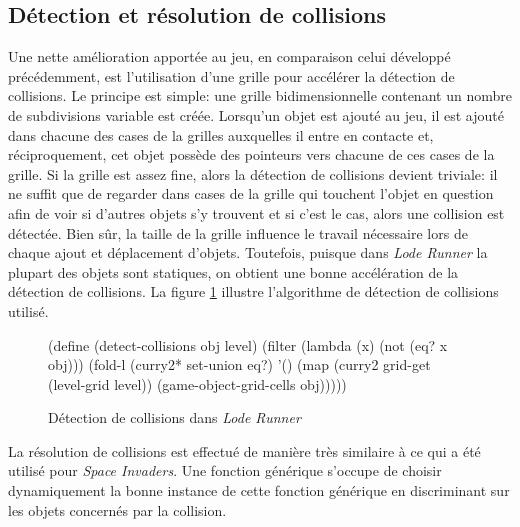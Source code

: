 \documentclass[12pt,twoside,letterpaper,francais]{book}
\newcommand{\scheme}[1]{\selectlanguage{english}{\tt #1}\selectlanguage{french}}
\begin{document}
\subsection{Détection et résolution de collisions}
Une nette amélioration apportée au jeu, en comparaison celui développé
précédemment, est l'utilisation d'une grille pour accélérer la
détection de collisions. Le principe est simple: une grille
bidimensionnelle contenant un nombre de subdivisions variable est
créée. Lorsqu'un objet est ajouté au jeu, il est ajouté dans chacune
des cases de la grilles auxquelles il entre en contacte et,
réciproquement, cet objet possède des pointeurs vers chacune de ces
cases de la grille. Si la grille est assez fine, alors la détection de
collisions devient triviale: il ne suffit que de regarder dans cases
de la grille qui touchent l'objet en question afin de voir si d'autres
objets s'y trouvent et si c'est le cas, alors une collision est
détectée. Bien sûr, la taille de la grille influence le travail
nécessaire lors de chaque ajout et déplacement d'objets. Toutefois,
puisque dans \textit{Lode Runner} la plupart des objets sont statiques, on obtient une
bonne accélération de la détection de collisions. La figure
\ref{Exp:lr-col-detection} illustre l'algorithme de détection de
collisions utilisé.\\

\begin{figure}[htb!]
  \begin{schemecode}
(define (detect-collisions obj level)
  (filter (lambda (x) (not (eq? x obj)))
          (fold-l (curry2* set-union eq?)
                  '()
                  (map (curry2 grid-get (level-grid level))
                       (game-object-grid-cells obj)))))
  \end{schemecode}
  \caption{Détection de collisions dans \textit{Lode Runner}}
  \label{Exp:lr-col-detection}
\end{figure}

La résolution de collisions est effectué de manière très similaire à
ce qui a été utilisé pour \textit{Space Invaders}. Une fonction générique
\scheme{resolve-collision} s'occupe de choisir dynamiquement la bonne
instance de cette fonction générique en discriminant sur les objets
concernés par la collision.


\FloatBarrier
\end{document}
